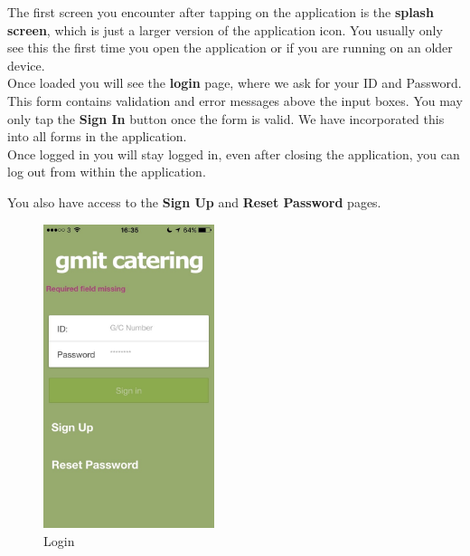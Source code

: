 \begin{minipage}{0.55\textwidth}
The first screen you encounter after tapping on the application is the \textbf{splash screen}, which is just a larger version of the application icon.
You usually only see this the first time you open the application or if you are running on an older device.
\\

Once loaded you will see the \textbf{login} page, where we ask for your ID and Password.
This form contains validation and error messages above the input boxes.
You may only tap the \textbf{Sign In} button once the form is valid.
We have incorporated this into all forms in the application.
\\

Once logged in you will stay logged in, even after closing the application, you can log out from within the application.

You also have access to the \textbf{Sign Up} and \textbf{Reset Password} pages.
\end{minipage}
\begin{minipage}{5cm}
	\begin{figure}[H]
		\includegraphics[width=5cm]{img/mobile-app/screen-shots/IMG_2904.jpg}
		\caption{Login}
	\end{figure}
\end{minipage} \hfill


